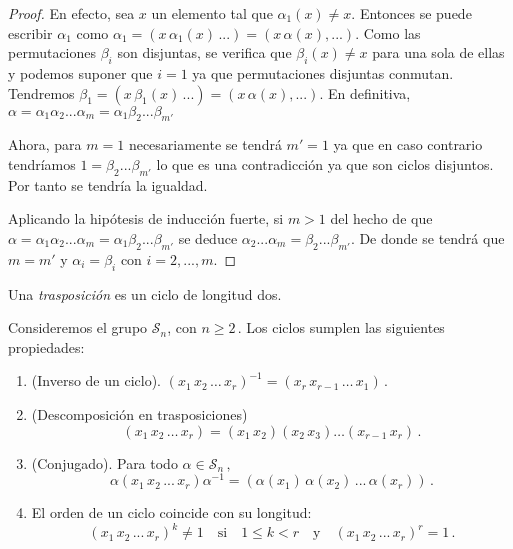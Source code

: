 \begin{proof}
En efecto, sea $x$ un elemento tal que $\alpha_1(x) \neq x$. Entonces se puede escribir $\alpha_1$ como $\alpha_1 = (x \, \alpha_1(x) \, ...) = (x \, \alpha(x),...)$. Como las permutaciones $\beta_i$ son disjuntas, se verifica que $\beta_i(x) \neq x$ para una sola de ellas y podemos suponer que $i = 1$ ya que permutaciones disjuntas conmutan. Tendremos $\beta_1 = (x \, \beta_1(x) \, ...) = (x \, \alpha(x),...)$. En definitiva, $\alpha = \alpha_1\alpha_2...\alpha_m = \alpha_1\beta_2...\beta_{m'}$

Ahora, para $m = 1$ necesariamente se tendrá $m' = 1$ ya que en caso contrario tendríamos $1 = \beta_2...\beta_{m'}$ lo que es una contradicción ya que son ciclos disjuntos. Por tanto se tendría la igualdad. 

Aplicando la hipótesis de inducción fuerte, si $m > 1$ del hecho de que $\alpha = \alpha_1\alpha_2...\alpha_m = \alpha_1\beta_2...\beta_{m'}$ se deduce $\alpha_2...\alpha_m = \beta_2...\beta_{m'}$. De donde se tendrá que $m = m'$ y $\alpha_i = \beta_i$ con $i=2,...,m$.
\end{proof}

\begin{ndef}[Trasposición]
Una \textit{trasposición} es un ciclo de longitud dos.
\end{ndef}

\begin{nprop}
\label{proposition:propiedades-ciclos}
Consideremos el grupo $\mathcal S_n$, con $n \ge 2$\,. Los ciclos sumplen las siguientes propiedades:

\begin{enumerate}
  \item (Inverso de un ciclo). $(x_1 \, x_2 \, \hdots \, x_r)^{-1} = (x_r \, x_{r-1} \, \hdots \, x_1)$\,.
  \item (Descomposición en trasposiciones) \begin{equation*}
    (x_1 \, x_2 \, \hdots \, x_r) = (x_1 \, x_2)(x_2 \, x_3) \hdots (x_{r-1} \, x_r)\,.
  \end{equation*}
  \item (Conjugado). Para todo $\alpha \in \mathcal S_n\,,$ \begin{equation*}
    \alpha (x_1 \, x_2 \, ... \, x_r) \alpha^{-1} = \left(\alpha(x_1) \, \alpha(x_2) \, ... \, \alpha(x_r)\right)\,.
  \end{equation*}
  \item El orden de un ciclo coincide con su longitud: \begin{equation*}
    (x_1 \, x_2 \, ... \, x_r)^k \neq 1 \quad \text{si} \quad 1 \le k < r \quad \text{y}\quad (x_1 \, x_2 \, ... \, x_r)^r = 1\,.
  \end{equation*}
\end{enumerate}
\end{nprop}

